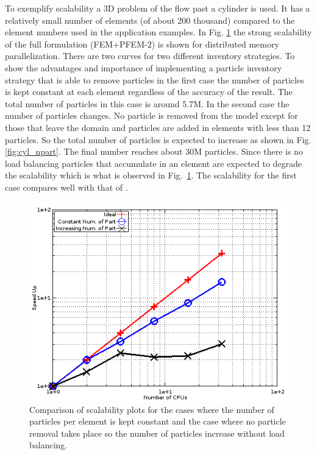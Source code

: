 To exemplify scalability a 3D problem of the flow past a cylinder is used. It has a relatively small number of elements (of about 200 thousand) compared to the element numbers used in the application examples. 
In Fig. \ref{fig:scalab} the strong scalability of the full formulation (FEM+PFEM-2) is shown for distributed memory parallelization. There are two curves for two different inventory strategies. To show the advantages and importance of implementing a particle inventory strategy that is able to remove particles in the first case the number of particles is kept constant at each element regardless of the accuracy of the result. The total number of particles in this case is around 5.7M. In the second case the number of particles changes. No particle is removed from the model except for those that leave the domain and particles are added in elements with less than 12 particles. So the total number of particles is expected to increase as shown in Fig. \ref{fig:cyl_npart}. The final number reaches about 30M particles. Since there is no load balancing particles that accumulate in an element are expected to degrade the scalability which is what is observed in Fig.~\ref{fig:scalab}. The scalability for the first case compares well with that of \cite{gimenez:parallel}.
%
\begin{figure}[htp] 
\centering 
\includegraphics[scale=.6]{./imgs/scalability1.png}
\caption{Comparison of scalability plots for the cases where the number of particles per element is kept constant and the case where no particle removal takes place so the number of particles increase without load balancing.}
\label{fig:scalab}
\end{figure}
